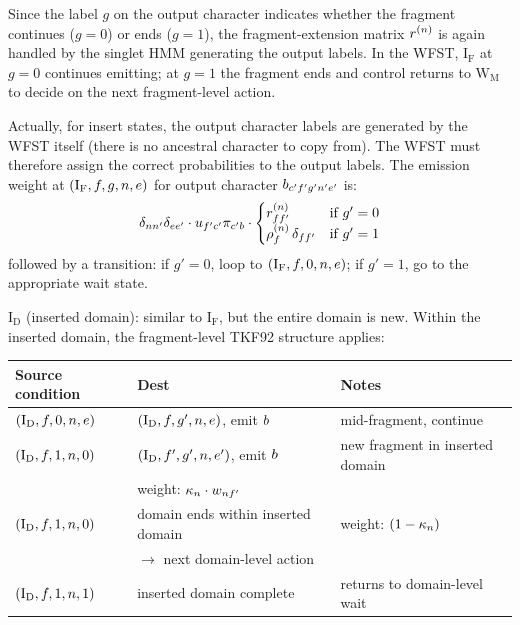 Since the label $g$ on the output character indicates whether the fragment continues ($g=0$)
or ends ($g=1$), the fragment-extension matrix $r^{(n)}$ is again handled by
the singlet HMM generating the output labels.
In the WFST, $\mathrm{I_F}$ at $g=0$ continues emitting; at $g=1$ the fragment ends
and control returns to $\mathrm{W_M}$ to decide on the next fragment-level action.

Actually, for insert states, the output character labels are generated by the WFST itself
(there is no ancestral character to copy from).
The WFST must therefore assign the correct probabilities to the output labels.
The emission weight at $(\mathrm{I_F}, f, g, n, e)$ for output character
$b_{c'f' g'n' e'}$ is:
\begin{equation}
\label{eq:if-emit}
\delta_{nn'} \delta_{ee'} \cdot
u_{f'c'} \pi_{c'b} \cdot
\begin{cases}
r^{(n)}_{ff'} & \text{if } g' = 0 \\
\rho^{(n)}_f\,\delta_{ff'} & \text{if } g' = 1
\end{cases}
\end{equation}
followed by a transition: if $g'=0$, loop to $(\mathrm{I_F}, f, 0, n, e)$;
if $g'=1$, go to the appropriate wait state.

\medskip
\noindent $\mathrm{I_D}$ (inserted domain): similar to $\mathrm{I_F}$, but the entire
domain is new. Within the inserted domain, the fragment-level TKF92 structure applies:
\begin{center}
\renewcommand{\arraystretch}{1.3}
\begin{tabular}{lll}
\hline
Source condition & Dest & Notes \\
\hline
$(\mathrm{I_D}, f, 0, n, e)$ &
  $(\mathrm{I_D}, f, g', n, e)$, emit $b$ &
  mid-fragment, continue \\
$(\mathrm{I_D}, f, 1, n, 0)$ &
  $(\mathrm{I_D}, f', g', n, e')$, emit $b$ &
  new fragment in inserted domain \\
  & weight: $\kappa_n \cdot w_{nf'}$ & \\
$(\mathrm{I_D}, f, 1, n, 0)$ &
  domain ends within inserted domain &
  weight: $(1-\kappa_n)$ \\
  & $\to$ next domain-level action & \\
$(\mathrm{I_D}, f, 1, n, 1)$ &
  inserted domain complete &
  returns to domain-level wait \\
\hline
\end{tabular}
\end{center}


